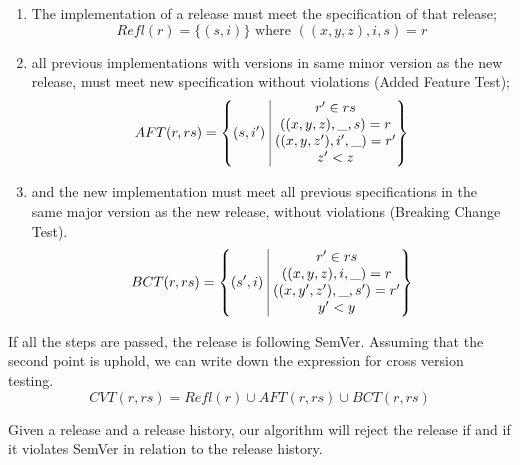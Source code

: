 \begin{enumerate}
\item The implementation of a release must meet the specification of
  that release;
  $$ Refl(r) = \{(s, i)\} \text{ where } ((x,y,z), i, s) = r $$

    \item all previous implementations with versions in same minor version as the
    new release, must meet new specification without violations (Added Feature
    Test);
    $$AFT(r, rs) = \left\{ (s, i')\ \vline\ 
        \begin{matrix}
            r' \in rs \\
        ((x,y,z), \_, s) = r \\ 
        ((x,y,z'), i', \_) = r'\\
        z' < z \\
        \end{matrix}
    \right\}$$

    \item and the new implementation must meet all previous specifications in the same major version as the new
        release, without violations (Breaking Change Test).
    $$BCT(r, rs) = \left\{ (s', i)\ \vline\ 
        \begin{matrix}
            r' \in rs \\
        ((x, y, z), i, \_) = r \\ 
        ((x, y', z'), \_, s') = r'\\
        y' < y \\
        \end{matrix}
    \right\}$$
\end{enumerate}

If all the steps are passed, the release is following SemVer. Assuming that the 
second point is uphold, we can write down the expression for cross version testing. 
$$ CVT(r, rs) = Refl(r) \cup AFT(r, rs) \cup BCT(r, rs) $$

\begin{theorem}[Soundness]
Given a release and a release history, our algorithm will reject the release if
and if it violates SemVer in relation to the release history.
\end{theorem}

